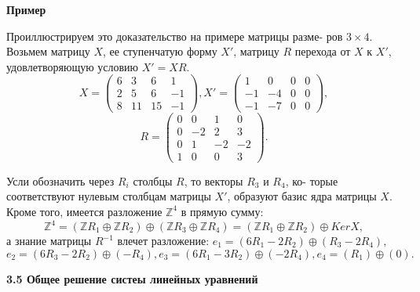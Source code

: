 \documentclass{mai_book}
\begin{document}
	\noindent
	{\bf Пример}
	
	Проиллюстрируем это доказательство на примере матрицы разме-\linebreak
	ров $3\times 4$. Возьмем матрицу $X$, ее ступенчатую форму $X'$, матрицу $R$\linebreak
	перехода от $X$ к $X'$, удовлетворяющую условию $X' = XR$.
	$$X = \begin{pmatrix} 6 & 3 & 6 & 1 \\ 2 & 5 & 6 & -1 \\ 8 & 11 & 15 & -1 \end{pmatrix}, X' = \begin{pmatrix} 1 & 0 & 0 & 0 \\ -1 & -4 & 0 & 0 \\ -1 & -7 & 0 & 0 \end{pmatrix},$$
	$$R = \begin{pmatrix} 0 & 0 & 1 & 0 \\ 0 & -2 & 2 & 3 \\ 0 & 1 & -2 & -2 \\ 1 & 0 & 0 & 3 \end{pmatrix}.$$
	
	\pagebreak
	
	
	Усли обозначить через $R_i$ столбцы $R$, то векторы $R_3$ и $R_4$, ко-\linebreak
	торые соответствуют нулевым столбцам матрицы $X'$, образуют базис\linebreak
	ядра матрицы $X$. Кроме того, имеется разложение ${\mathbb Z}^4$ в прямую сумму:\linebreak
	$${\mathbb Z}^4 = (\mathbb Z R_1\oplus \mathbb Z R_2) \oplus (\mathbb Z R_3\oplus \mathbb Z R_4) = (\mathbb Z R_1\oplus \mathbb Z R_2) \oplus KerX,$$
	а знание матрицы $R^{-1}$ влечет разложение: $e_1 = (6R_1 - 2R_2) \oplus (R_3 - 2R_4),$\linebreak
	$e_2 = (6R_3 - 2R_2) \oplus (-R_4), e_3 = (6R_1 - 3R_2) \oplus (-2R_4), e_4 = (R_1) \oplus (0).$
	
	\noindent
	{\large {\bf 3.5 Общее решение систеы линейных уравнений}}
	
\end{document}
